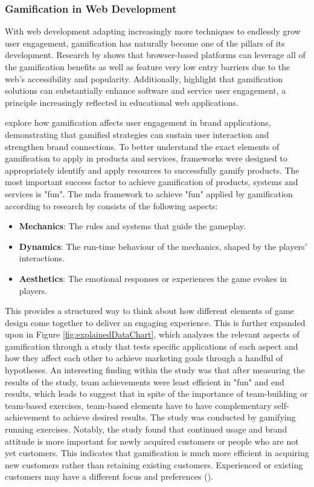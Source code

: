 \subsubsection{Gamification in Web Development}

With web development adapting increasingly more techniques to endlessly grow user engagement, gamification has naturally become one of the pillars of its development. 
Research by \textcite{roleOfMobile} shows that browser-based platforms can leverage all of the gamification benefits as well as feature very low entry barriers due to the web's accessibility and popularity. 
Additionally, \textcite{doesItWork} highlight that gamification solutions can substantially enhance software and service user engagement, a principle increasingly reflected in educational web applications.

\textcite{sustainability} explore how gamification affects user engagement in brand applications, demonstrating that gamified strategies can sustain user interaction and strengthen brand connections. 
To better understand the exact elements of gamification to apply in products and services, frameworks were designed to appropriately identify and apply resources to successfully gamify products. 
The most important success factor to achieve gamification of products, systems and services is "fun". 
The \acrshort{mda} framework to achieve "fun" applied by gamification according to research by \textcite{sustainability} consists of the following aspects:

\begin{itemize}
    \item \textbf{Mechanics}:  The rules and systems that guide the gameplay.
    \item \textbf{Dynamics}:  The run-time behaviour of the mechanics, shaped by the players' interactions.
    \item \textbf{Aesthetics}:  The emotional responses or experiences the game evokes in players.
\end{itemize}

This provides a structured way to think about how different elements of game design come together to deliver an engaging experience. 
This is further expanded upon in Figure \ref{fig:explainedDataChart}, which analyzes the relevant aspects of gamification through a study that tests specific applications of each aspect and how they affect each other to achieve marketing goals through a handful of hypotheses. 
An interesting finding within the study was that after measuring the results of the study, team achievements were least efficient in "fun" and end results, which leads to suggest that in spite of the importance of team-building or team-based exercises, team-based elements have to have complementary self-achievement to achieve desired results. 
The study was conducted by gamifying running exercises. 
Notably, the study found that continued usage and brand attitude is more important for newly acquired customers or people who are not yet customers. 
This indicates that gamification is much more efficient in acquiring new customers rather than retaining existing customers. 
Experienced or existing customers may have a different focus and preferences (\cite{sustainability}).

